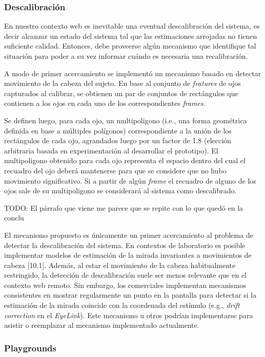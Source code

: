 \subsubsection{Descalibración}

En nuestro contexto web es inevitable una eventual descalibración del sistema,
es decir alcanzar un estado del sistema tal que las estimaciones arrojadas no
tienen suficiente calidad.
Entonces, debe proveerse algún mecanismo que identifique tal situación para
poder a su vez informar cuándo es necesaria una recalibración.

A modo de primer acercamiento se implementó un mecanismo basado en detectar
movimiento de la cabeza del sujeto.
En base al conjunto de \textit{features} de ojos capturados al calibrar, se
obtienen un par de conjuntos de rectángulos que contienen a los ojos en cada
uno de los correspondientes \textit{frames}.

Se definen luego, para cada ojo, un multipoligono (i.e., una forma geométrica
definida en base a múltiples polígonos) correspondiente a la unión de los
rectángulos de cada ojo, agrandados luego por un factor de 1.8 (elección
arbitraria basada en experimentación al desarrollar el prototipo).
El multipoligono obtenido para cada ojo representa el espacio dentro del cual
el recuadro del ojo deberá mantenerse para que se considere que no hubo
movimiento significativo.
Si a partir de algún \textit{frame} el recuadro de alguno de los ojos sale de
su multipoligono se considerará al sistema como descalibrado.

TODO: El párrafo que viene me parece que se repite con lo que quedó en la
conclu

El mecanismo propuesto es únicamente un primer acercamiento al problema de
detectar la descalibración del sistema.
En contextos de laboratorio es posible implementar modelos de estimación de la
mirada invariantes a movimientos de cabeza [10.1].
Además, al estar el movimiento de la cabeza habitualmente restringido, la
detección de descalibración suele ser menos relevante que en el contexto web
remoto.
Sin embargo, los \eyetrackers comerciales implementan mecanismos consistentes
en mostrar regularmente un punto en la pantalla para detectar si la estimación
de la mirada coincide con la coordenada del estímulo (e.g., \textit{drift
correction} en el \eyetracker \textit{EyeLink}).
Este mecanismo u otros podrían implementarse para asistir o reemplazar al
mecanismo implementado actualmente.

\subsubsection{Playgrounds}


